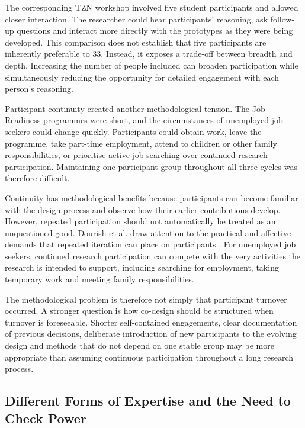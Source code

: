 The corresponding TZN workshop involved five student participants and allowed closer interaction. The researcher could hear participants' reasoning, ask follow-up questions and interact more directly with the prototypes as they were being developed. This comparison does not establish that five participants are inherently preferable to 33. Instead, it exposes a trade-off between breadth and depth. Increasing the number of people included can broaden participation while simultaneously reducing the opportunity for detailed engagement with each person's reasoning.

Participant continuity created another methodological tension. The Job Readiness programmes were short, and the circumstances of unemployed job seekers could change quickly. Participants could obtain work, leave the programme, take part-time employment, attend to children or other family responsibilities, or prioritise active job searching over continued research participation. Maintaining one participant group throughout all three cycles was therefore difficult.

Continuity has methodological benefits because participants can become familiar with the design process and observe how their earlier contributions develop. However, repeated participation should not automatically be treated as an unquestioned good. Dourish et al. draw attention to the practical and affective demands that repeated iteration can place on participants \cite{dourish2020}. For unemployed job seekers, continued research participation can compete with the very activities the research is intended to support, including searching for employment, taking temporary work and meeting family responsibilities.

The methodological problem is therefore not simply that participant turnover occurred. A stronger question is how co-design should be structured when turnover is foreseeable. Shorter self-contained engagements, clear documentation of previous decisions, deliberate introduction of new participants to the evolving design and methods that do not depend on one stable group may be more appropriate than assuming continuous participation throughout a long research process.


\subsection{Different Forms of Expertise and the Need to Check Power}

